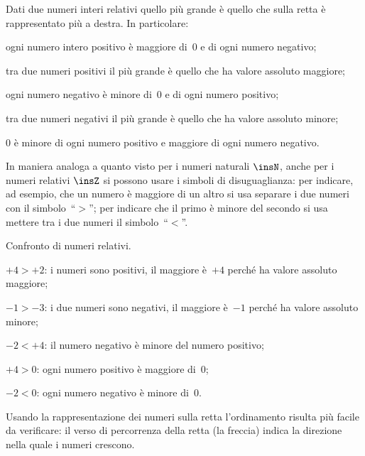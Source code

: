 Dati due numeri interi relativi quello più grande è quello che sulla retta è rappresentato più a destra.
In particolare:
 \begin{enumeratea}
 \item ogni numero intero positivo è maggiore di~0 e di ogni numero negativo;
 \item tra due numeri positivi il più grande è quello che ha valore assoluto maggiore;
 \item ogni numero negativo è minore di~0 e di ogni numero positivo;
 \item tra due numeri negativi il più grande è quello che ha valore assoluto minore;
 \item 0 è minore di ogni numero positivo e maggiore di ogni numero negativo.
 \end{enumeratea}

In maniera analoga a quanto visto per i numeri naturali $\insN$, anche per i numeri relativi $\insZ$ si possono usare i simboli di disuguaglianza: per indicare, ad esempio, che un numero è maggiore di un altro si usa separare i due numeri con il
simbolo~``$>$''; per indicare che il primo è minore del secondo si usa mettere tra i due numeri il simbolo~``$<$''.

\begin{exrig}
 \begin{esempio}
 Confronto di numeri relativi.
 \begin{itemize*}
 \item $+4>+2$: i numeri sono positivi, il maggiore è~$+4$ perché ha valore assoluto maggiore;
 \item $-1>-3$: i due numeri sono negativi, il maggiore è~$-1$ perché ha valore assoluto minore;
 \item $-2<+4$: il numero negativo è minore del numero positivo;
 \item $+4>0$: ogni numero positivo è maggiore di~0;
 \item $-2<0$: ogni numero negativo è minore di~0.
 \end{itemize*}
 \end{esempio}
\end{exrig}

Usando la rappresentazione dei numeri sulla retta l'ordinamento risulta più facile da verificare:
il verso di percorrenza della retta (la freccia) indica la direzione nella quale i numeri crescono.

\vspazio\ovalbox{\risolvii \ref{ese:2.1}, \ref{ese:2.2}, \ref{ese:2.3}, \ref{ese:2.4}}

